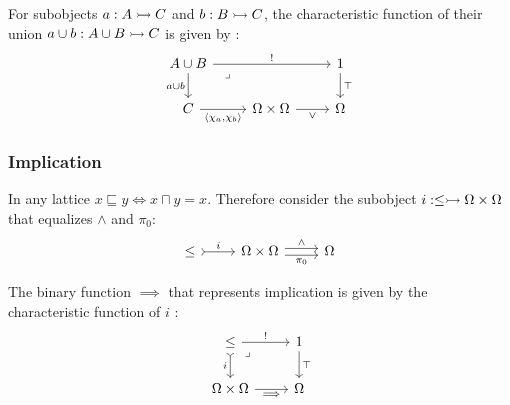 \begin{definition}[Union]
  For subobjects $a:A\rightarrowtail C$ and $b:B\rightarrowtail C$, the characteristic function of
  their union $a\cup b:A\cup B \rightarrowtail C$ is given by
  \parencite[p.~147]{goldblatt:topoi}:
  \[\begin{tikzcd}[ampersand replacement=\&]
    {A\cup B} \&\& 1 \\
    C \& \Omega\times\Omega \& \Omega
    \arrow["{!}", from=1-1, to=1-3]
    \arrow["\top", from=1-3, to=2-3]
    \arrow["\lor"', from=2-2, to=2-3]
    \arrow["{a\cup b}"', from=1-1, to=2-1]
    \arrow["{\langle\chi_a, \chi_b\rangle}"', from=2-1, to=2-2]
    \arrow["\lrcorner"{anchor=center, pos=0.125}, draw=none, from=1-1, to=2-3]
  \end{tikzcd}\]
\end{definition}

\subsubsection{Implication}

\begin{definition}[Implication]
  In any lattice $x \sqsubseteq y \iff x \sqcap y = x$. Therefore consider the
  subobject $i: \leq\rightarrowtail \Omega\times\Omega$ that equalizes $\land$ and
  $\pi_0$:
  \[\begin{tikzcd}[ampersand replacement=\&]
    \leq \& \Omega\times\Omega \& \Omega
    \arrow["\land", shift left=1, from=1-2, to=1-3]
    \arrow["{\pi_0}"', shift right=1, from=1-2, to=1-3]
    \arrow["i", tail, from=1-1, to=1-2]
  \end{tikzcd}\]

  The binary function $\implies$ that represents implication is given by the characteristic function of $i$ \parencite[p.~137]{goldblatt:topoi}:
  \[\begin{tikzcd}[ampersand replacement=\&]
    \leq \& 1 \\
    \Omega\times\Omega \& \Omega
    \arrow["i"', tail, from=1-1, to=2-1]
    \arrow["{!}", from=1-1, to=1-2]
    \arrow["\top", from=1-2, to=2-2]
    \arrow["\implies"', from=2-1, to=2-2]
    \arrow["\lrcorner"{anchor=center, pos=0.125}, draw=none, from=1-1, to=2-2]
  \end{tikzcd}\]
\end{definition}